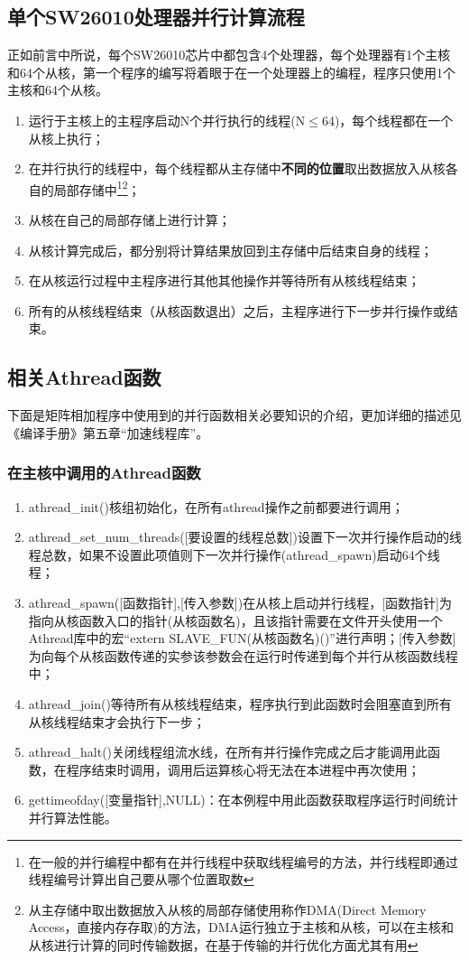 \subsection{单个SW26010处理器并行计算流程}\label{section:并行计算的基本流程}
正如前言中所说，每个SW26010芯片中都包含4个处理器，每个处理器有1个主核和64个从核，第一个程序的编写将着眼于在一个处理器上的编程，程序只使用1个主核和64个从核。

\begin{enumerate}
	\item 运行于主核上的主程序启动N个并行执行的线程(N$\leq$64)，每个线程都在一个从核上执行；
	\item 在并行执行的线程中，每个线程都从主存储中\textbf{不同的位置}取出数据放入从核各自的局部存储中\footnote{在一般的并行编程中都有在并行线程中获取线程编号的方法，并行线程即通过线程编号计算出自己要从哪个位置取数\label{footnote:取数据说明}}\footnote{从主存储中取出数据放入从核的局部存储使用称作DMA(Direct Memory Access，直接内存存取)的方法，DMA运行独立于主核和从核，可以在主核和从核进行计算的同时传输数据，在基于传输的并行优化方面尤其有用\label{footnote:DMA}}；
	\item 从核在自己的局部存储上进行计算；
	\item 从核计算完成后，都分别将计算结果放回到主存储中后结束自身的线程；
	\item 在从核运行过程中主程序进行其他其他操作并等待所有从核线程结束；
	\item 所有的从核线程结束（从核函数退出）之后，主程序进行下一步并行操作或结束。
\end{enumerate}

\subsection{相关Athread函数}
下面是矩阵相加程序中使用到的并行函数相关必要知识的介绍，更加详细的描述见《编译手册》第五章“加速线程库”。
\subsubsection{在主核中调用的Athread函数}
\begin{enumerate}
	\item athread\_init()核组初始化，在所有athread操作之前都要进行调用；
	\item athread\_set\_num\_threads([要设置的线程总数])设置下一次并行操作启动的线程总数，如果不设置此项值则下一次并行操作(athread\_spawn)启动64个线程；
	\item athread\_spawn([函数指针],[传入参数])在从核上启动并行线程，[函数指针]为指向从核函数入口的指针(从核函数名)，且该指针需要在文件开头使用一个Athread库中的宏“extern SLAVE\_FUN(从核函数名)()”进行声明；[传入参数]为向每个从核函数传递的实参该参数会在运行时传递到每个并行从核函数线程中；
	\item athread\_join()等待所有从核线程结束，程序执行到此函数时会阻塞直到所有从核线程结束才会执行下一步；
	\item athread\_halt()关闭线程组流水线，在所有并行操作完成之后才能调用此函数，在程序结束时调用，调用后运算核心将无法在本进程中再次使用；
	\item gettimeofday([变量指针],NULL)：在本例程中用此函数获取程序运行时间统计并行算法性能。
\end{enumerate}


